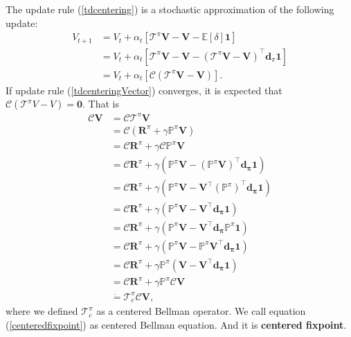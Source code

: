The update rule (\ref{tdcentering}) is a stochastic approximation
of the following update:
\begin{equation}
\begin{split}
V_{t+1}&=V_{t}+\alpha_t [\bm{\mathcal{T}}^{\pi}\bm{V}-\bm{V}-\mathbb{E}[\delta]\bm{1}]\\
&=V_{t}+\alpha_t [\bm{\mathcal{T}}^{\pi}\bm{V}-\bm{V}-(\bm{\mathcal{T}}^{\pi}\bm{V}-\bm{V})^{\top}\bm{d}_{\pi}\bm{1}]\\
&=V_{t}+\alpha_t [\mathcal{C}(\bm{\mathcal{T}}^{\pi}\bm{V}-\bm{V})].
\end{split}
\label{tdcenteringVector}
\end{equation}
If update rule (\ref{tdcenteringVector}) converges, it is expected that
$\mathcal{C}(\mathcal{T}^{\pi}V-V)=\bm{0}$.
That is 
\begin{equation}
    \begin{split}
    \mathcal{C}\bm{V} &= \mathcal{C}\bm{\mathcal{T}}^{\pi}\bm{V} \\
    &= \mathcal{C}(\bm{R}^{\pi} + \gamma \mathbb{P}^{\pi} \bm{V}) \\
    &= \mathcal{C}\bm{R}^{\pi} + \gamma \mathcal{C}\mathbb{P}^{\pi} \bm{V} \\
    &= \mathcal{C}\bm{R}^{\pi} + \gamma (\mathbb{P}^{\pi} \bm{V} - (\mathbb{P}^{\pi} \bm{V})^{\top} \bm{d_{\pi}} \bm{1}) \\
    &= \mathcal{C}\bm{R}^{\pi} + \gamma (\mathbb{P}^{\pi} \bm{V} - \bm{V}^{\top} (\mathbb{P}^{\pi})^{\top} \bm{d_{\pi}} \bm{1}) \\  %
    &= \mathcal{C}\bm{R}^{\pi} + \gamma (\mathbb{P}^{\pi} \bm{V} - \bm{V}^{\top} \bm{d_{\pi}} \bm{1}) \\
    &= \mathcal{C}\bm{R}^{\pi} + \gamma (\mathbb{P}^{\pi} \bm{V} - \bm{V}^{\top} \bm{d_{\pi}} \mathbb{P}^{\pi} \bm{1}) \\
    &= \mathcal{C}\bm{R}^{\pi} + \gamma (\mathbb{P}^{\pi} \bm{V} - \mathbb{P}^{\pi} \bm{V}^{\top} \bm{d_{\pi}} \bm{1}) \\
    &= \mathcal{C}\bm{R}^{\pi} + \gamma \mathbb{P}^{\pi} (\bm{V} - \bm{V}^{\top} \bm{d_{\pi}} \bm{1}) \\
    &= \mathcal{C}\bm{R}^{\pi} + \gamma \mathbb{P}^{\pi} \mathcal{C}\bm{V} \\
    &\dot{=} \bm{\mathcal{T}}_c^{\pi} \mathcal{C}\bm{V},
    \end{split}
    \label{centeredfixpoint}
    \end{equation}
where we defined $\bm{\mathcal{T}}_c^{\pi}$ as a centered Bellman operator.
We call equation (\ref{centeredfixpoint}) as centered Bellman equation.
And it is \textbf{centered fixpoint}.

